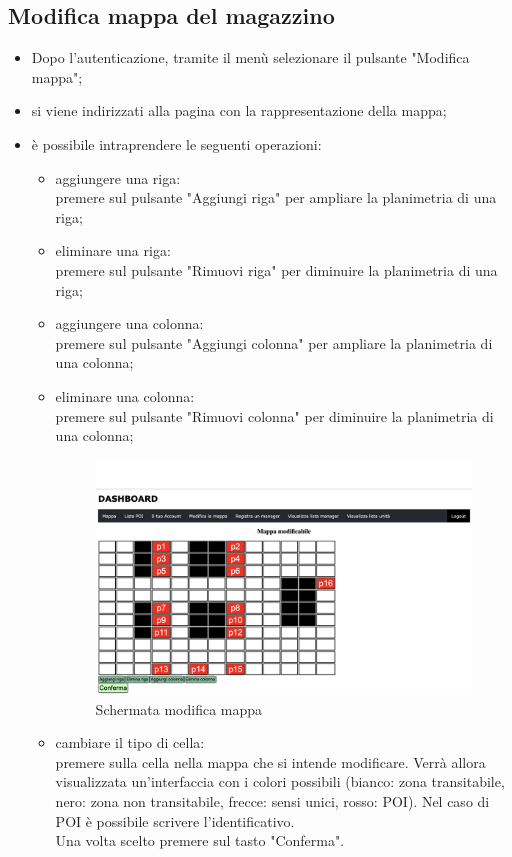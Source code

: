 \subsection{Modifica mappa del magazzino}
\begin{itemize}
    \item Dopo l'autenticazione, tramite il menù selezionare il pulsante "Modifica mappa";
    \item si viene indirizzati alla pagina con la rappresentazione della mappa;
    \item è possibile intraprendere le seguenti operazioni:
        \begin{itemize}
            \item aggiungere una riga: \\premere sul pulsante "Aggiungi riga" per ampliare la planimetria di una riga;
            \item eliminare una riga: \\premere sul pulsante "Rimuovi riga" per diminuire la planimetria di una riga;
            \item aggiungere una colonna: \\premere sul pulsante "Aggiungi colonna" per ampliare la planimetria di una colonna;
            \item eliminare una colonna: \\premere sul pulsante "Rimuovi colonna" per diminuire la planimetria di una colonna;
            \begin{figure}[H]
                \centering
                \includegraphics[scale=0.12]{res/images/managemap_admni1.png}
                \caption{Schermata modifica mappa}
            \end{figure}
            \item cambiare il tipo di cella: \\premere sulla cella nella mappa che si intende modificare. Verrà allora visualizzata un'interfaccia con i colori possibili (bianco: zona transitabile, nero: zona non transitabile, frecce: sensi unici, rosso: POI). Nel caso di POI è possibile scrivere l'identificativo. \\Una volta scelto premere sul tasto "Conferma".

\end{itemize}
\end{itemize}
